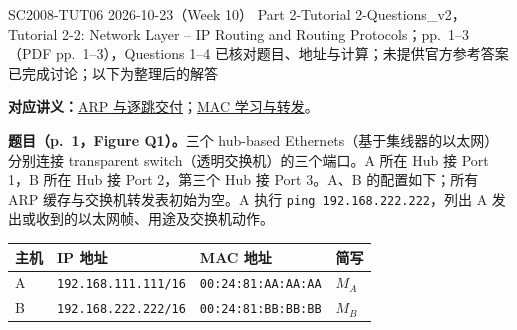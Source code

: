 \begingroup
\renewcommand{\recordid}[1]{}
\renewcommand{\relatedtopic}[2]{\hyperref[topic:#1]{#2}}
\label{tutorial:SC2008-TUT06}

\tutorialmeta
  {SC2008-TUT06}
  {2026-10-23（Week 10）}
  {Part 2-Tutorial 2-Questions\_v2，Tutorial 2-2: Network Layer -- IP Routing and Routing Protocols；pp.~1--3（PDF pp.~1--3），Questions 1--4}
  {已核对题目、地址与计算；未提供官方参考答案}
  {已完成讨论；以下为整理后的解答}

\linespread{1.1}\selectfont
\setlength{\parskip}{0.3em}
\setlength{\topsep}{0.3em}

\textbf{对应讲义：}\relatedtopic{SC2008-L06-T03}{ARP 与逐跳交付}；\relatedtopic{SC2008-L07-T01}{MAC 学习与转发}。

\textbf{题目（p.~1，Figure Q1）。}三个 hub-based Ethernets（基于集线器的以太网）分别连接 transparent switch（透明交换机）的三个端口。A 所在 Hub 接 Port 1，B 所在 Hub 接 Port 2，第三个 Hub 接 Port 3。A、B 的配置如下；所有 ARP 缓存与交换机转发表初始为空。A 执行 \texttt{ping 192.168.222.222}，列出 A 发出或收到的以太网帧、用途及交换机动作。

\begin{center}
\small
\begin{tabular}{@{}llll@{}}
\toprule
主机 & IP 地址 & MAC 地址 & 简写 \\
\midrule
A & \texttt{192.168.111.111/16} & \texttt{00:24:81:AA:AA:AA} & $M_A$ \\
B & \texttt{192.168.222.222/16} & \texttt{00:24:81:BB:BB:BB} & $M_B$ \\
\bottomrule
\end{tabular}
\end{center}

